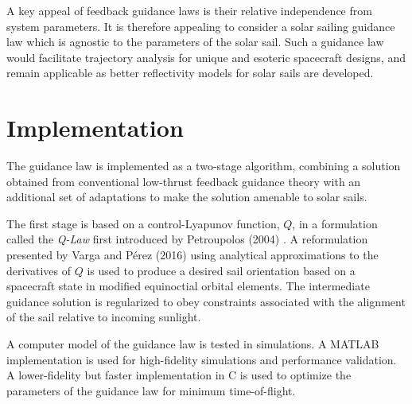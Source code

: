 A key appeal of feedback guidance laws is their relative independence from system parameters. It is therefore appealing to consider a solar sailing guidance law which is agnostic to the parameters of the solar sail. Such a guidance law would facilitate trajectory analysis for unique and esoteric spacecraft designs, and remain applicable as better reflectivity models for solar sails are developed.

\section{Implementation}
The guidance law is implemented as a two-stage algorithm, combining a solution obtained from conventional low-thrust feedback guidance theory with an additional set of adaptations to make the solution amenable to solar sails.

The first stage is based on a control-Lyapunov function, $Q$, in a formulation called the \textit{\textit{Q-Law}} first introduced by Petroupolos (2004) \cite{petropoulos2004low}. A reformulation presented by Varga and Pérez (2016) \cite{vargaperez2016} using analytical approximations to the derivatives of $Q$ is used to produce a desired sail orientation based on a spacecraft state in modified equinoctial orbital elements. The intermediate guidance solution is regularized to obey constraints associated with the alignment of the sail relative to incoming sunlight.

A computer model of the guidance law is tested in simulations. A MATLAB implementation is used for high-fidelity simulations and performance validation. A lower-fidelity but faster implementation in C is used to optimize the parameters of the guidance law for minimum time-of-flight.